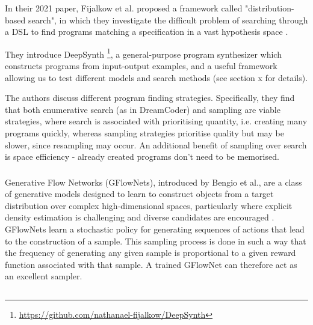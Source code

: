 


\subsubsection{}

In their 2021 paper, Fijalkow et al. proposed a framework called "distribution-based search", in which they investigate the difficult problem of searching through a DSL to find programs matching a specification in a vast hypothesis space \cite{fijalkow_scaling_2021}.

They introduce DeepSynth \footnote{\url{https://github.com/nathanael-fijalkow/DeepSynth}}, a general-purpose program synthesizer which constructs programs from input-output examples, and a useful framework allowing us to test different models and search methods (see section x for details).

The authors discuss different program finding strategies. Specifically, they find that both enumerative search (as in DreamCoder) and sampling are viable strategies, where search is associated with prioritising quantity, i.e.  creating many programs quickly, whereas sampling strategies prioritise quality but may be slower, since resampling may occur. An additional benefit of sampling over search is space efficiency - already created programs don't need to be memorised.


\subsubsection{}
Generative Flow Networks (GFlowNets), introduced by Bengio et al., are a class of generative models designed to learn to construct objects from a target distribution over complex high-dimensional spaces, particularly where explicit density estimation is challenging and diverse candidates are encouraged \cite{bengio_flow_2021}. GFlowNets learn a stochastic policy for generating sequences of actions that lead to the construction of a sample. This sampling process is done in such a way that the frequency of generating any given sample is proportional to a given reward function associated with that sample. A trained GFlowNet can therefore act as an excellent sampler.



\subsection{}

